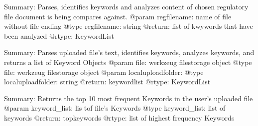 \documentclass[letterpaper,10pt,english]{sphinxmanual}
\begin{document}

\begin{fulllineitems}
\label{\detokenize{functionsv1:common_functions.homeCount}}
\end{fulllineitems}


\begin{fulllineitems}
\label{\detokenize{functionsv1:common_functions.interpretexistingfile}}
Summary: Parses, identifies keywords and analyzes content of chosen regulatory file document is being compares against.
@param regfilename: name of file without file ending
@type regfilename: string
@return: list of kwywords that have been analyzed
@rtype: KeywordList

\end{fulllineitems}


\begin{fulllineitems}
\label{\detokenize{functionsv1:common_functions.interpretfile}}
Summary: Parses uploaded file’s text, identifies keywords, analyzes keywords, and returns a list of Keyword Objects
@param file: werkzeug filestorage object
@type file: werkzeug filestorage object
@param localuploadfolder:
@type localuploadfolder: string
@return: keywordlist
@rtype: KeywordList

\end{fulllineitems}


\begin{fulllineitems}
\label{\detokenize{functionsv1:common_functions.kwhighestfrequencies}}
Summary: Returns the top 10 most frequent Keywords in the user’s uploaded file
@param keyword\_list: lis tof file’s Keywords
@type keyword\_list: list of keywords
@return: topkeywords
@rtype: list of highest frequency Keywords

\end{fulllineitems}
\end{document}
